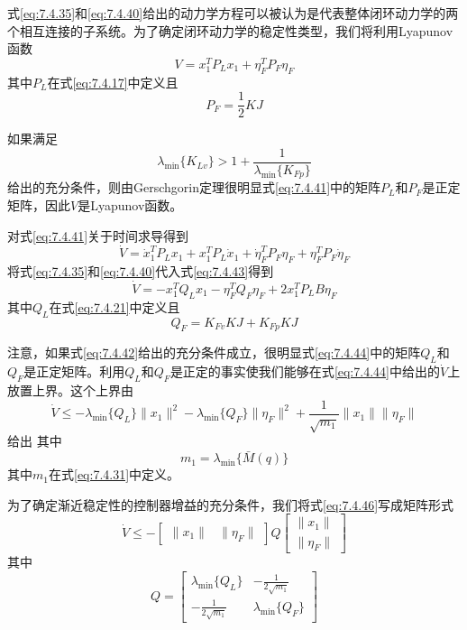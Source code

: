 \documentclass[UTF8]{ctexart}
\begin{document}
式\eqref{eq:7.4.35}和\eqref{eq:7.4.40}给出的动力学方程可以被认为是代表整体闭环动力学的两个相互连接的子系统。为了确定闭环动力学的稳定性类型，我们将利用Lyapunov函数
\begin{equation}\label{eq:7.4.41}
V = x_1^T P_L x_1 + \eta_F^T P_F \eta_F
\end{equation}
其中$P_L$在式\eqref{eq:7.4.17}中定义且
\begin{equation*}
P_F = \frac{1}{2}KJ
\end{equation*}

如果满足
\begin{equation}\label{eq:7.4.42}
\lambda_{\min}\{K_{Lv}\} > 1 + \frac{1}{\lambda_{\min}\{K_{Fp}\}}
\end{equation}
给出的充分条件，则由Gerschgorin定理很明显式\eqref{eq:7.4.41}中的矩阵$P_L$和$P_F$是正定矩阵，因此$V$是Lyapunov函数。

对式\eqref{eq:7.4.41}关于时间求导得到
\begin{equation}\label{eq:7.4.43}
\dot{V} = \dot{x}_1^T P_L x_1 + x_1^T P_L \dot{x}_1 + \dot{\eta}_F^T P_F \eta_F + \eta_F^T P_F \dot{\eta}_F
\end{equation}
将式\eqref{eq:7.4.35}和\eqref{eq:7.4.40}代入式\eqref{eq:7.4.43}得到
\begin{equation}\label{eq:7.4.44}
\dot{V} = -x_1^T Q_L x_1 - \eta_F^T Q_F \eta_F + 2x_1^T P_L B \eta_F
\end{equation}
其中$Q_L$在式\eqref{eq:7.4.21}中定义且
\begin{equation}\label{eq:7.4.45}
Q_F = K_{Fv}KJ + K_{Fp}KJ
\end{equation}

注意，如果式\eqref{eq:7.4.42}给出的充分条件成立，很明显式\eqref{eq:7.4.44}中的矩阵$Q_L$和$Q_F$是正定矩阵。利用$Q_L$和$Q_F$是正定的事实使我们能够在式\eqref{eq:7.4.44}中给出的$\dot{V}$上放置上界。这个上界由
\begin{equation}\label{eq:7.4.46}
\dot{V} \leq -\lambda_{\min}\{Q_L\}\|x_1\|^2 - \lambda_{\min}\{Q_F\}\|\eta_F\|^2 + \frac{1}{\sqrt{m_1}}\|x_1\|\|\eta_F\|
\end{equation}
给出
其中
\begin{equation*}
m_1 = \lambda_{\min}\{\bar{M}(q)\}
\end{equation*}
其中$m_1$在式\eqref{eq:7.4.31}中定义。

为了确定渐近稳定性的控制器增益的充分条件，我们将式\eqref{eq:7.4.46}写成矩阵形式
\begin{equation}\label{eq:7.4.47}
\dot{V} \leq -\begin{bmatrix} \|x_1\| & \|\eta_F\| \end{bmatrix} Q \begin{bmatrix} \|x_1\| \\ \|\eta_F\| \end{bmatrix}
\end{equation}
其中
\begin{equation*}
Q = \begin{bmatrix} \lambda_{\min}\{Q_L\} & -\frac{1}{2\sqrt{m_1}} \\ -\frac{1}{2\sqrt{m_1}} & \lambda_{\min}\{Q_F\} \end{bmatrix}
\end{equation*}
\end{document}

